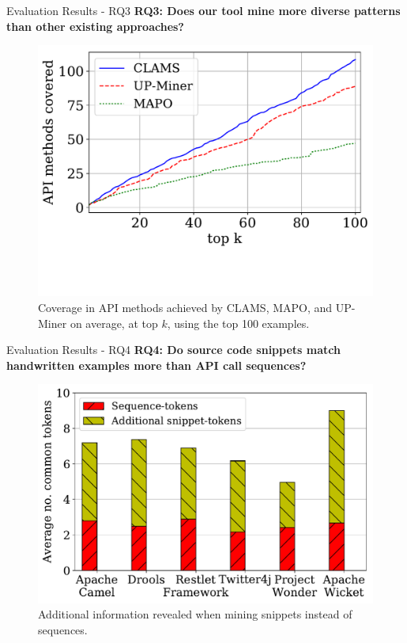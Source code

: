 \documentclass[11pt]{beamer}
\begin{document}
\begin{frame}{Evaluation Results - RQ3}
	\textbf{RQ3: Does our tool mine more diverse patterns than other existing approaches?}
	\begin{figure}
		\centering
		\includegraphics[scale=0.3]{images/Exp3CoverageAtk}
		\vspace{-20pt}
		\caption[]{Coverage in API methods achieved by CLAMS, MAPO, and UP-Miner on average, at top $k$, using the top 100 examples.}
	\end{figure}
\end{frame}

\begin{frame}{Evaluation Results - RQ4}
	\textbf{RQ4: Do source code snippets match handwritten examples more than API call sequences?}
	  
	\begin{figure}
		\centering
		\includegraphics[width=0.525\columnwidth]{images/Exp4AdditInfo}
		\caption{Additional information revealed when mining snippets instead of sequences.}
		\label{res:Exp4AdditInfo}
	\end{figure}
\end{frame}
\end{document}
